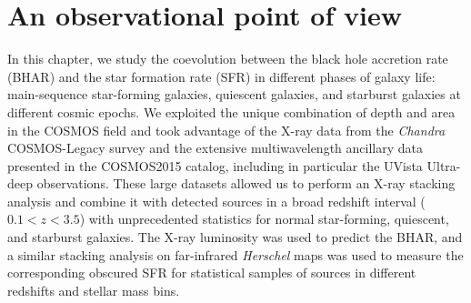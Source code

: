 \chapter{An observational point of view} \label{ch:observations}


In this chapter, we study the coevolution between the black hole accretion rate (BHAR) and the star formation rate (SFR) in different phases of galaxy life: main-sequence star-forming galaxies, quiescent galaxies, and starburst galaxies at different cosmic epochs.
   We exploited the unique combination of depth and area in the COSMOS field and took advantage of the X-ray data from the {\it Chandra} COSMOS-Legacy survey and the extensive multiwavelength ancillary data presented in the COSMOS2015 catalog, including in particular the UVista Ultra-deep observations.
   These large datasets allowed us to perform an X-ray stacking analysis and combine it with detected sources in a broad redshift interval ($0.1<z<3.5$) with unprecedented statistics for normal star-forming, quiescent, and starburst galaxies. 
   The X-ray luminosity was used to predict the BHAR, and a similar stacking analysis on far-infrared {\it Herschel} maps was used to measure the corresponding obscured SFR for statistical samples of sources in different redshifts and stellar mass bins.
   
